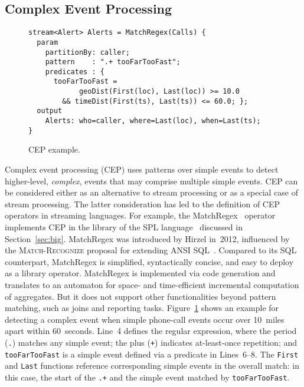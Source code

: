 \subsection{Complex Event Processing}\label{sec:cep} %


\begin{figure}[!h]
\begin{lstlisting}
stream<Alert> Alerts = MatchRegex(Calls) {
  param
    partitionBy: caller;
    pattern    : ".+ tooFarTooFast";
    predicates : {
      tooFarTooFast =
            geoDist(First(loc), Last(loc)) >= 10.0
        && timeDist(First(ts), Last(ts)) <= 60.0; };
  output
    Alerts: who=caller, where=Last(loc), when=Last(ts);
}
\end{lstlisting}
\vspace*{-4mm}
\caption{\label{fig:cep}CEP example.}
\end{figure}


Complex event processing (CEP) uses patterns over simple events to
detect higher-level, \emph{complex}, events that may comprise multiple
simple events.  CEP can be considered either as an alternative to
stream processing or as a special case of stream processing. The
latter consideration has led to the definition of CEP operators in
streaming languages. For example, the MatchRegex~\cite{hirzel_2012}
operator implements CEP in the library of the SPL
language~\cite{hirzel_schneider_gedik_2017} discussed in
Section~\ref{sec:big}. MatchRegex was introduced by Hirzel in~2012,
influenced by the \textsc{Match-Recognize} proposal for extending ANSI
SQL~\cite{zemke_et_al_2007}.  Compared to its SQL counterpart,
MatchRegex is simplified, syntactically concise, and easy to deploy as
a library operator. MatchRegex is implemented via code generation and
translates to an automaton for space- and time-efficient incremental
computation of aggregates. But it does not support other
functionalities beyond pattern matching, such as joins and reporting
tasks. Figure~\ref{fig:cep} shows an example for detecting a complex
event when simple phone-call events occur over 10~miles apart within
60~seconds. Line~4 defines the regular expression, where the period
(\lstinline{.}) matches any simple event; the plus (\lstinline{+})
indicates at-least-once repetition; and \lstinline{tooFarTooFast} is a
simple event defined via a predicate in \mbox{Lines 6--8}. The
\lstinline{First} and \lstinline{Last} functions reference
corresponding simple events in the overall match: in this case, the
start of the \lstinline{.+} and the simple event matched by
\lstinline{tooFarTooFast}.

